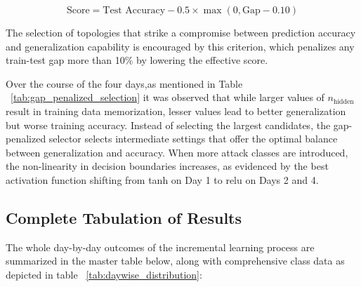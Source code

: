 \begin{equation}
\text{Score} = \text{Test Accuracy} - 0.5 \times \max(0, \text{Gap} - 0.10)
\end{equation}

\noindent
The selection of topologies that strike a compromise between prediction accuracy and generalization capability is encouraged by this criterion, which penalizes any train-test gap more than 10\% by lowering the effective score.

\begin{table}[h]
\centering
\caption{Gap-Penalized Hyperparameter Selection Across Incremental Days}
\label{tab:gap_penalized_selection}
\end{table}

\noindent
Over the course of the four days,as mentioned in Table ~\ref{tab:gap_penalized_selection} it was observed that while larger values of $n_{\text{hidden}}$ result in training data memorization, lesser values lead to better generalization but worse training accuracy. Instead of selecting the largest candidates, the gap-penalized selector selects intermediate settings that offer the optimal balance between generalization and accuracy. When more attack classes are introduced, the non-linearity in decision boundaries increases, as evidenced by the best activation function shifting from tanh on Day 1 to relu on Days 2 and 4.

\subsection{Complete Tabulation of Results}
The whole day-by-day outcomes of the incremental learning process are summarized in the master table below, along with comprehensive class data as depicted in table ~\ref{tab:daywise_distribution}:

